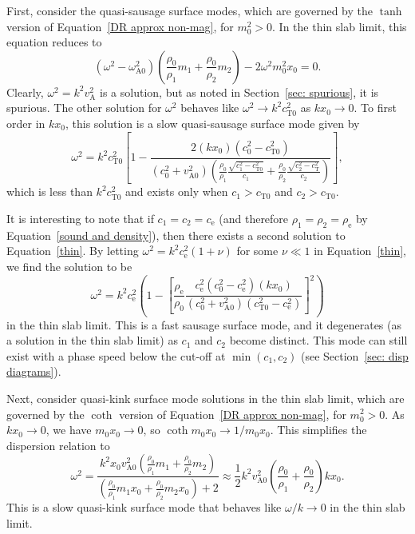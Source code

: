 First, consider the quasi-sausage surface modes, which are governed by the $\tanh$ version of Equation~\eqref{DR approx non-mag}, for $m_0^2 > 0$. In the thin slab limit, this equation reduces to
\begin{equation}
(\omega^2 - \omega_\textrm{A0}^2)\left(\frac{\rho_0}{\rho_1}m_1 + \frac{\rho_0}{\rho_2}m_2\right) -  2\omega^2m_0^2x_0 = 0. \label{thin}
\end{equation}
Clearly, $\omega^2={k^2v_\textrm{A}^2}$ is a solution, but as noted in Section~\ref{sec: spurious}, it is spurious. The other solution for $\omega^2$ behaves like $\omega^2 \to k^2c_\textrm{T0}^2$ as $kx_0 \to 0$. To first order in $kx_0$, this solution is a slow quasi-sausage surface mode given by
\begin{equation}
\omega^2 = k^2c_\textrm{T0}^2 \left[1 - \frac{2(kx_0)(c_0^2 - c_\textrm{T0}^2)}{(c_0^2 + v_\textrm{A0}^2)\left(\frac{\rho_0}{\rho_1}\frac{\sqrt{c_1^2 - c_\textrm{T0}^2}}{c_1} + \frac{\rho_0}{\rho_2}\frac{\sqrt{c_2^2 - c_\textrm{T}^2}}{c_2}\right)}\right],
\label{thin slab slow saus surf}
\end{equation}
which is less than $k^2c_\textrm{T0}^2$ and exists only when $c_1 > c_\textrm{T0}$ and $c_2 > c_\textrm{T0}$. 

It is interesting to note that if $c_1 = c_2 = c_\textrm{e}$ (and therefore $\rho_1 = \rho_2 = \rho_\textrm{e}$ by Equation~\eqref{sound and density}), then there exists a second solution to Equation~\eqref{thin}. By letting $\omega^2 = k^2c_\textrm{e}^2(1 + \nu)$ for some $\nu \ll 1$ in Equation~\eqref{thin}, we find the solution to be
\begin{equation}
\omega^2 = k^2c_\textrm{e}^2\left(1 - \left[\frac{\rho_\textrm{e}}{\rho_0}\frac{c_\textrm{e}^2(c_0^2 - c_\textrm{e}^2)(kx_0)}{(c_0^2 + v_\textrm{A0}^2)(c_\textrm{T0}^2 - c_\textrm{e}^2)}\right]^2\right)
\label{thin slab fast saus surf}
\end{equation}
in the thin slab limit. This is a fast sausage surface mode, and it degenerates (as a solution in the thin slab limit) as $c_1$ and $c_2$ become distinct. This mode can still exist with a phase speed below the cut-off at $\min(c_1, c_2)$ (see Section~\ref{sec: disp diagrams}).

Next, consider quasi-kink surface mode solutions in the thin slab limit, which are governed by the $\coth$ version of Equation~\eqref{DR approx non-mag}, for $m_0^2 > 0$. As $kx_0 \to 0$, we have $m_0x_0 \to 0$, so $\coth{m_0x_0} \to 1/m_0x_0$. This simplifies the dispersion relation to
\begin{equation}
\omega^2 = \frac{k^2x_0v_\textrm{A0}^2\left(\frac{\rho_0}{\rho_1}m_1 + \frac{\rho_0}{\rho_2}m_2\right)}{\left(\frac{\rho_0}{\rho_1}m_1x_0 + \frac{\rho_0}{\rho_2}m_2x_0\right) + 2} \approx \frac{1}{2}k^2v_\textrm{A0}^2\left(\frac{\rho_0}{\rho_1} + \frac{\rho_0}{\rho_2}\right)kx_0.
\label{thin slab slow kink surf}
\end{equation}
This is a slow quasi-kink surface mode that behaves like $\omega/k \to 0$ in the thin slab limit.

